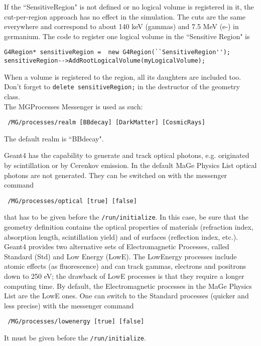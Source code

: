 If the  ``SensitiveRegion" is not defined or 
no logical volume is registered in it, the cut-{}per-{}region 
approach has no effect in the simulation. The cuts are the same everywhere and 
correspond to about 140 keV (gammas) and 7.5 MeV (e-) in germanium. 
The code to register one logical volume in the ``Sensitive Region" is \\
\begin{lstlisting}
G4Region* sensitiveRegion =  new G4Region(``SensitiveRegion'');
sensitiveRegion-->AddRootLogicalVolume(myLogicalVolume);
\end{lstlisting}
When a volume is registered to the region, all its daughters are included too.
Don't forget to \texttt{delete sensitiveRegion;} in the destructor of the 
geometry class.\\
The MGProcesses Messenger is used as such:
 \begin{lstlisting}
 /MG/processes/realm [BBdecay] [DarkMatter] [CosmicRays]
\end{lstlisting}
The default realm is ``BBdecay".
 
Geant4 has the capability to generate and track optical photons, e.g. originated by scintillation or by 
Cerenkov emission. In the default MaGe Physics List optical photons are not generated. They can be switched 
on with the messenger command 
 
\begin{lstlisting}
 /MG/processes/optical [true] [false]
\end{lstlisting}
                    that has to be given before the 
\texttt{/\-r\-u\-n\-/\-i\-n\-i\-t\-i\-a\-l\-i\-z\-e}. In this case, 
be sure that the geometry definition contains the optical properties of materials (refraction index, absorption 
length, scintillation yield) and of surfaces (reflection index, etc.).\\
Geant4 provides two alternative sets of Electromagnetic Processes, called Standard (Std) and Low Energy (LowE). 
The LowEnergy processes include atomic effects (as fluorescence) and can track gammas, electrons and positrons 
down to 250 eV; the drawback of LowE processes is that they require a longer computing time. By default, the 
Electromagnetic processes in the MaGe Physics List are the LowE ones. One can switch to the Standard processes 
(quicker and less precise) with the messenger command 
\begin{lstlisting}
 /MG/processes/lowenergy [true] [false]
\end{lstlisting}
It must be given before the 
\texttt{/\-r\-u\-n\-/\-i\-n\-i\-t\-i\-a\-l\-i\-z\-e}.

